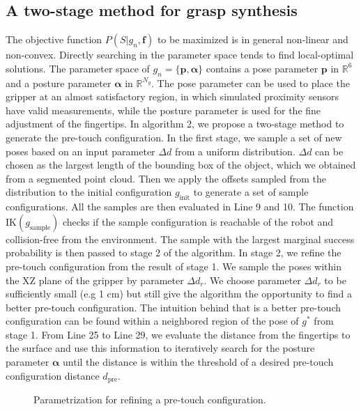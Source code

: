 \subsection{A two-stage method for grasp synthesis}
The objective function $P(S | g_n, \bm{f})$ to be maximized is in general non-linear and non-convex. Directly searching in the parameter space tends to find local-optimal solutions. The parameter space of $g_n = \lbrace \bm{p}, \bm{\alpha} \rbrace $ contains a pose parameter $\bm{p}$ in $\mathbb{R}^6$ and a posture parameter $\bm{\alpha}$ in $\mathbb{R}^{N_g}$. The pose parameter can be used to place the gripper at an almost satisfactory region, in which simulated proximity sensors have valid measurements,  while the posture parameter is used for the fine adjustment of the fingertips. In algorithm 2, we propose a two-stage method to generate the pre-touch configuration. In the first stage, we sample a set of new poses based on an input parameter $\Delta d$ from a uniform distribution. $\Delta d$ can be chosen as the largest length of the bounding box of the object, which we obtained from a segmented point cloud. Then we apply the offsets sampled from the distribution to the initial configuration $g_{\text{init}}$ to generate a set of sample configurations. All the samples are then evaluated in Line 9 and 10. The function IK$(g_{\text{sample}})$ checks if the sample configuration is reachable of the robot and collision-free from the environment. The sample with the largest marginal success probability is then passed to stage 2 of the algorithm. In stage 2, we refine the pre-touch configuration from the result of stage 1.  We sample the poses within the XZ plane of the gripper by parameter $\Delta d_r$. We choose parameter $\Delta d_r$ to be sufficiently small (e.g 1 cm) but still give the algorithm the opportunity to find a better pre-touch configuration. The intuition behind that is a better pre-touch configuration can be found within a neighbored region of the pose of $g^*$ from stage 1. From Line 25 to Line 29, we evaluate the distance from the fingertips to the surface and use this information to iteratively search for the posture parameter $\bm{\alpha}$ until the distance is within the threshold of a desired pre-touch configuration distance $d_{\text{pre}}$.

\begin{figure}[!htbp]
\centering
\def\svgwidth{0.4\linewidth}

\caption{Parametrization for refining a pre-touch configuration.}
\label{fig:algorith_help}
\end{figure}	



